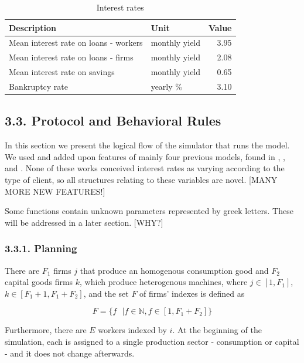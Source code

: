 \documentclass[11pt,]{article}
\begin{document}
\begin{table}

\caption{\label{tab:unnamed-chunk-25}\label{tab:int}Interest rates}
\centering
\begin{tabular}[t]{llr}
\toprule
Description & Unit & Value\\
\midrule
Mean interest rate on loans - workers & monthly yield & 3.95\\
Mean interest rate on loans - firms & monthly yield & 2.08\\
Mean interest rate on savings & monthly yield & 0.65\\
Bankruptcy rate & yearly \% & 3.10\\
\bottomrule
\end{tabular}
\end{table}

\subsection{3.3. Protocol and Behavioral
Rules}\label{protocol-and-behavioral-rules}

In this section we present the logical flow of the simulator that runs
the model. We used and added upon features of mainly four previous
models, found in \citet{ashraf1}, \citet{riccetti}, \citet{delligatti3}
and \citet{tesfatsion1}. None of these works conceived interest rates as
varying according to the type of client, so all structures relating to
these variables are novel. {[}MANY MORE NEW FEATURES!{]}

Some functions contain unknown parameters represented by greek letters.
These will be addressed in a later section. {[}WHY?{]}

\subsubsection{3.3.1. Planning}\label{planning}

There are \(F_1\) firms \(j\) that produce an homogenous consumption
good and \(F_2\) capital goods firms \(k\), which produce heterogenous
machines, where \(j \in [1,F_1]\), \(k \in [F_1+1, F_1 + F_2]\), and the
set \(F\) of firms' indexes is defined as

\begin{equation}
  F = \{f \text{ } | \text{} f \in \mathbb{N}, f\in [1,F_1 + F_2] \}
\end{equation}

Furthermore, there are \(E\) workers indexed by \(i\). At the beginning
of the simulation, each is assigned to a single production sector -
consumption or capital - and it does not change afterwards.
\end{document}
